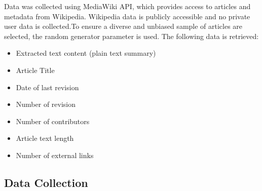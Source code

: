 
\label{sec:methodology}

Data was collected using MediaWiki API, which provides access to articles and metadata from Wikipedia. Wikipedia data is publicly accessible and no private user data is 
collected.To ensure a diverse and unbiased sample of articles are selected, the random generator parameter is used. The following data is retrieved: 

\begin{itemize}
    \item Extracted text content (plain text summary)
    \item Article Title
    \item Date of last revision
    \item Number of revision
    \item Number of contributors
    \item Article text length
    \item Number of external links
\end{itemize}


\subsection{Data Collection}

